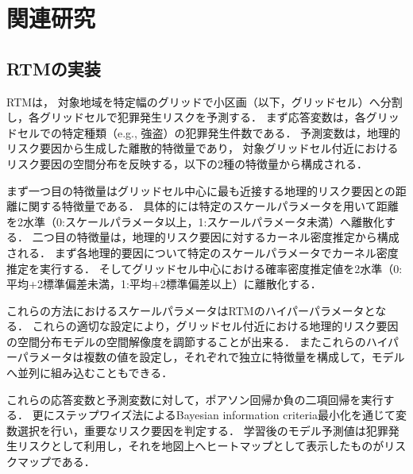 \section{関連研究}
\label{chapter_2}
\subsection{RTMの実装}
\label{conv_imp:sec}
RTM\cite{caplan2015risk}は，
対象地域を特定幅のグリッドで小区画（以下，グリッドセル）へ分割し，各グリッドセルで犯罪発生リスクを予測する．
まず応答変数は，各グリッドセルでの特定種類（e.g., 強盗）の犯罪発生件数である．
予測変数は，地理的リスク要因から生成した離散的特徴量であり，
対象グリッドセル付近におけるリスク要因の空間分布を反映する，以下の2種の特徴量から構成される．

まず一つ目の特徴量はグリッドセル中心に最も近接する地理的リスク要因との距離に関する特徴量である．
具体的には特定のスケールパラメータを用いて距離を2水準（0:スケールパラメータ以上，1:スケールパラメータ未満）へ離散化する．
%
二つ目の特徴量は，地理的リスク要因に対するカーネル密度推定から構成される．
まず各地理的要因について特定のスケールパラメータでカーネル密度推定を実行する\cite{bishop}．
そしてグリッドセル中心における確率密度推定値を2水準（0:平均+2標準偏差未満，1:平均+2標準偏差以上）に離散化する．

これらの方法におけるスケールパラメータはRTMのハイパーパラメータとなる．
これらの適切な設定により，グリッドセル付近における地理的リスク要因の空間分布モデルの空間解像度を調節することが出来る．
またこれらのハイパーパラメータは複数の値を設定し，それぞれで独立に特徴量を構成して，モデルへ並列に組み込むこともできる．

これらの応答変数と予測変数に対して，ポアソン回帰\cite{poisson}か負の二項回帰\cite{Hilbe_2011}を実行する．
更にステップワイズ法\cite{islp}によるBayesian information criteria最小化を通じて変数選択を行い，重要なリスク要因を判定する．
学習後のモデル予測値は犯罪発生リスクとして利用し，それを地図上へヒートマップとして表示したものがリスクマップである．

 
 
